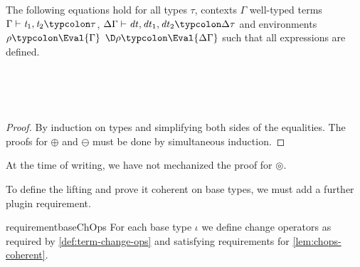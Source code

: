 \begin{lemma}
  \label{lem:chops-coherent}
  The following equations hold for all types \ensuremath{\tau}, contexts \ensuremath{\Gamma}
  well-typed terms \ensuremath{\Gamma\vdash\Varid{t}_{1},\Varid{t}_{2}\typcolon\tau}, \ensuremath{\Delta \Gamma\vdash\Varid{dt},\Varid{dt}_{1},\Varid{dt}_{2}\typcolon\Delta \tau}
  and environments \ensuremath{\rho\typcolon\Eval{\Gamma}} \ensuremath{\D\rho\typcolon\Eval{\Delta \Gamma}} such that all
  expressions are defined.
\begin{hscode}\SaveRestoreHook
{}%
%
\>[B]{}\;\D\rho\mathrel{=}\;\D\rho\oplus {}\;\D\rho{}\<[E]%
\\
\>[B]{}\;\rho\mathrel{=}\;\rho\oplus {}\;\rho{}\<[E]%
\\
\>[B]{}\;\rho\mathrel{=}\<[E]%
\\
\>[B]{}\;\D\rho\mathrel{=}\;\D\rho\circledcirc {}\;\D\rho{}\<[E]%
\ColumnHook
\end{hscode}\resethooks
\end{lemma}
\begin{proof}
  By induction on types and simplifying both sides of the equalities. The proofs
  for \ensuremath{\oplus } and \ensuremath{\ominus } must be done by simultaneous induction.
\end{proof}
At the time of writing, we have not mechanized the proof for \ensuremath{\circledcirc }.

To define the lifting and prove it coherent on base types, we must add a further
plugin requirement.

\begin{restatable}{requirement}{baseChOps}
  For each base type \ensuremath{\iota} we define change operators as required by \cref{def:term-change-ops}
  and satisfying requirements for \cref{lem:chops-coherent}.
\end{restatable}

